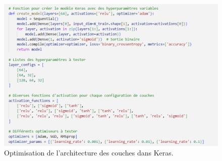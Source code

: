 \begin{figure}[H]
    \centering
    \includegraphics[width=0.9\linewidth]{capture_sas_80.png}
    \caption{Optimisation de l'architecture des couches dans Keras.}
    \label{arch}
\end{figure}

